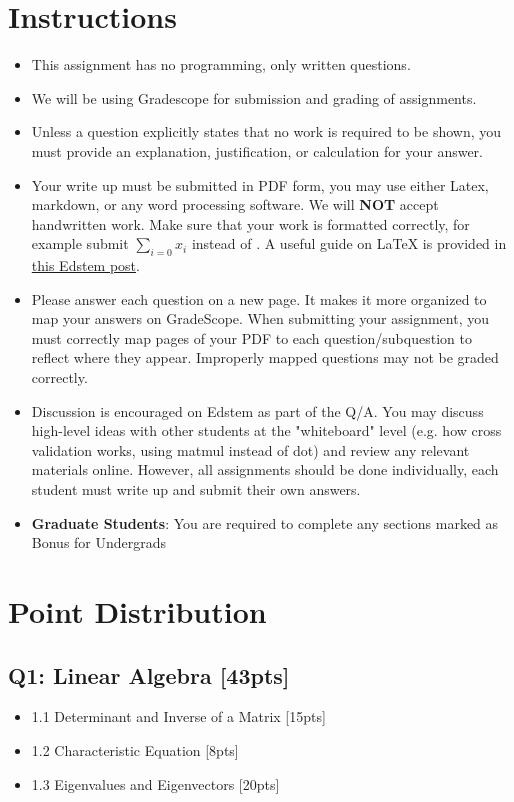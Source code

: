 \documentclass{article}
\begin{document}
\section*{Instructions}
\begin{itemize}
    \item This assignment has no programming, only written questions.
    \item We will be using Gradescope for submission and grading of assignments. 
    \item Unless a question explicitly states that no work is required to be shown, you must provide an explanation, justification, or calculation for your answer.
    \item Your write up must be submitted in PDF form, you may use either Latex,  markdown, or any word processing software. \color{red}We will \textbf{NOT} accept handwritten work. \color{black}Make sure that your work is formatted correctly, for example submit $\sum_{i=0} x_i$ instead of . A useful guide on LaTeX is provided in \href{https://edstem.org/us/courses/16925/discussion/995658}{this Edstem post}.
    \item Please answer each question on a new page. It makes it more organized to map your answers on GradeScope. When submitting your assignment, you must correctly map pages of your PDF to each question/subquestion to reflect where they appear. Improperly mapped questions may not be graded correctly.
    \item Discussion is encouraged on Edstem as part of the Q/A. You may discuss high-level ideas with other students at the "whiteboard" level (e.g. how cross validation works, using matmul instead of dot) and review any relevant materials online. However, all assignments should be done individually, each student must write up and submit their own answers.
    \item \textbf{Graduate Students}: You are required to complete any sections marked as Bonus for Undergrads
\end{itemize}
\newpage
\section*{Point Distribution}
\subsection*{Q1: Linear Algebra [43pts]}
\begin{itemize}
    \item 1.1 Determinant and Inverse of a Matrix [15pts]
    \item 1.2 Characteristic Equation [8pts]
    \item 1.3 Eigenvalues and Eigenvectors [20pts]
\end{itemize}
\end{document}
